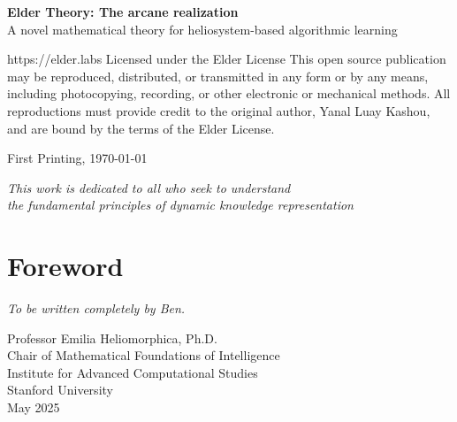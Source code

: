 \documentclass[11pt,twoside]{book}
\begin{document}
\thispagestyle{empty}
\vspace*{3cm}
\begin{center}
    {\Large\bfseries Elder Theory: The arcane realization}\\[2mm]
    {\large A novel mathematical theory for heliosystem-based algorithmic learning}
\end{center}
https://elder.labs
\vspace{2cm}
\noindent
Licensed under the Elder License
\vspace{0.5cm}
\noindent
This open source publication may be reproduced, distributed, or transmitted in any form or by any means, including photocopying, recording, or other electronic or mechanical methods. All reproductions must provide credit to the original author, Yanal Luay Kashou, and are bound by the terms of the Elder License.
\vspace{0.5cm}


\noindent 
First Printing, \today

\vspace{4cm}
\begin{center}
    \textit{This work is dedicated to all who seek to understand\\
    the fundamental principles of dynamic knowledge representation}
\end{center}

\newpage

\tableofcontents

\newpage
\listoffigures

\newpage
\listoftables

\chapter*{Foreword}

\textit{To be written completely by Ben.}

\vspace{1cm}
\begin{flushright}
Professor Emilia Heliomorphica, Ph.D.\\
Chair of Mathematical Foundations of Intelligence\\
Institute for Advanced Computational Studies\\
Stanford University\\
May 2025
\end{flushright}
\end{document}
